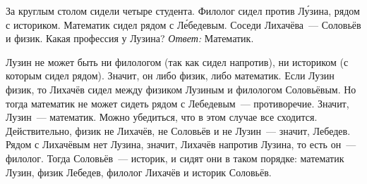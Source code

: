 \problem
За круглым столом сидели четыре студента.
Филолог сидел против Л\'{у}зина, рядом с историком.
Математик сидел рядом с Л\'{е}бедевым.
Соседи Лихачёва~--- Соловьёв и физик.
Какая профессия у Лузина?
\solution
\emph{Ответ:} Математик.
\par
Лузин не может быть ни филологом (так как сидел напротив), ни историком
(с которым сидел рядом).
Значит, он либо физик, либо математик.
Если Лузин физик, то Лихачёв сидел между физиком Лузиным и филологом
Соловьёвым.
Но тогда математик не может сидеть рядом с Лебедевым~--- противоречие.
Значит, Лузин~--- математик.
Можно убедиться, что в этом случае все сходится.
Действительно, физик не Лихачёв, не Соловьёв и не Лузин~--- значит, Лебедев.
Рядом с Лихачёвым нет Лузина, значит, Лихачёв напротив Лузина, то есть он~---
филолог.
Тогда Соловьёв~--- историк, и сидят они в таком порядке:
математик Лузин, физик Лебедев, филолог Лихачёв и историк Соловьёв.
\endproblem
